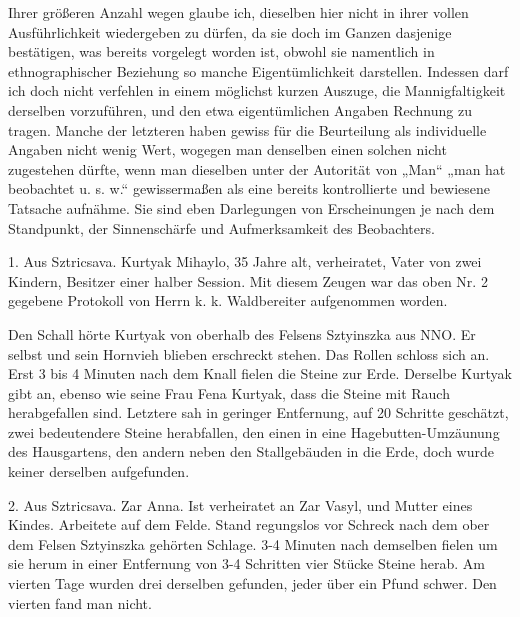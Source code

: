 \documentclass[a4paper, 11pt, oneside, german]{article}
\begin{document}
Ihrer größeren Anzahl wegen glaube ich, dieselben hier nicht in ihrer vollen Ausführlichkeit wiedergeben zu dürfen, da sie doch im Ganzen dasjenige bestätigen, was bereits vorgelegt worden ist, obwohl sie namentlich in ethnographischer Beziehung so manche Eigentümlichkeit darstellen. Indessen darf ich doch nicht verfehlen in einem möglichst kurzen Auszuge, die Mannigfaltigkeit derselben vorzuführen, und den etwa eigentümlichen Angaben Rechnung zu tragen. Manche der letzteren haben gewiss für die Beurteilung als individuelle Angaben nicht wenig Wert, wogegen man denselben einen solchen nicht zugestehen dürfte, wenn man dieselben unter der Autorität von „Man“ „man hat beobachtet u. s. w.“ gewissermaßen als eine bereits kontrollierte und bewiesene Tatsache aufnähme. Sie sind eben Darlegungen von Erscheinungen je nach dem Standpunkt, der Sinnenschärfe und Aufmerksamkeit des Beobachters.

1. Aus Sztricsava. Kurtyak Mihaylo, 35 Jahre alt, verheiratet, Vater von zwei Kindern, Besitzer einer halber Session. Mit diesem Zeugen war das oben Nr. 2 gegebene Protokoll von Herrn k. k. Waldbereiter aufgenommen worden.

Den Schall hörte Kurtyak von oberhalb des Felsens Sztyinszka aus NNO. Er selbst und sein Hornvieh blieben erschreckt stehen. Das Rollen schloss sich an. Erst 3 bis 4 Minuten nach dem Knall fielen die Steine zur Erde. Derselbe Kurtyak gibt an, ebenso wie seine Frau Fena Kurtyak, dass die Steine mit Rauch herabgefallen sind. Letztere sah in geringer Entfernung, auf 20 Schritte geschätzt, zwei bedeutendere Steine herabfallen, den einen in eine Hagebutten-Umzäunung des Hausgartens, den andern neben den Stallgebäuden in die Erde, doch wurde keiner derselben aufgefunden.

2. Aus Sztricsava. Zar Anna. Ist verheiratet an Zar Vasyl, und Mutter eines Kindes. Arbeitete auf dem Felde. Stand regungslos vor Schreck nach dem ober dem Felsen Sztyinszka gehörten Schlage. 3-4 Minuten nach demselben fielen um sie herum in einer Entfernung von 3-4 Schritten vier Stücke Steine herab. Am vierten Tage wurden drei derselben gefunden, jeder über ein Pfund schwer. Den vierten fand man nicht.
\end{document}

